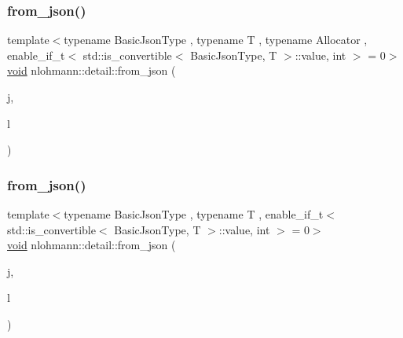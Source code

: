 \mbox{\label{namespacenlohmann_1_1detail_a5cfb765aad92795abd7fda29d017272a}} 
\subsubsection{\texorpdfstring{from\+\_\+json()}{from\_json()}\hspace{0.1cm}{\footnotesize\ttfamily [9/18]}}
{\footnotesize\ttfamily template$<$typename Basic\+Json\+Type , typename T , typename Allocator , enable\+\_\+if\+\_\+t$<$ std\+::is\+\_\+convertible$<$ Basic\+Json\+Type, T $>$\+::value, int $>$  = 0$>$ \\
\hyperlink{namespacenlohmann_1_1detail_a59fca69799f6b9e366710cb9043aa77d}{void} nlohmann\+::detail\+::from\+\_\+json (\begin{DoxyParamCaption}\item[{const Basic\+Json\+Type \&}]{j,  }\item[{std\+::forward\+\_\+list$<$ T, Allocator $>$ \&}]{l }\end{DoxyParamCaption})}

\mbox{\label{namespacenlohmann_1_1detail_a3df497b1d3977f071b488ecac1401517}} 
\subsubsection{\texorpdfstring{from\+\_\+json()}{from\_json()}\hspace{0.1cm}{\footnotesize\ttfamily [10/18]}}
{\footnotesize\ttfamily template$<$typename Basic\+Json\+Type , typename T , enable\+\_\+if\+\_\+t$<$ std\+::is\+\_\+convertible$<$ Basic\+Json\+Type, T $>$\+::value, int $>$  = 0$>$ \\
\hyperlink{namespacenlohmann_1_1detail_a59fca69799f6b9e366710cb9043aa77d}{void} nlohmann\+::detail\+::from\+\_\+json (\begin{DoxyParamCaption}\item[{const Basic\+Json\+Type \&}]{j,  }\item[{std\+::valarray$<$ T $>$ \&}]{l }\end{DoxyParamCaption})}

